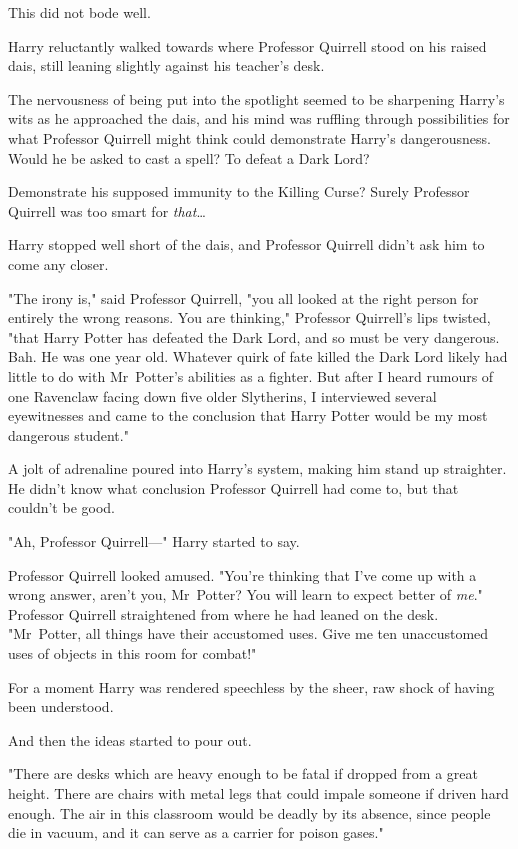 This did not bode well.

Harry reluctantly walked towards where Professor Quirrell stood on his raised
dais, still leaning slightly against his teacher’s desk.

The nervousness of being put into the spotlight seemed to be sharpening Harry’s
wits as he approached the dais, and his mind was ruffling through possibilities
for what Professor Quirrell might think could demonstrate Harry’s
dangerousness. Would he be asked to cast a spell? To defeat a Dark Lord?

Demonstrate his supposed immunity to the Killing Curse? Surely Professor
Quirrell was too smart for \emph{that}…

Harry stopped well short of the dais, and Professor Quirrell didn’t ask him to
come any closer.

"The irony is," said Professor Quirrell, "you all looked at the right person
for entirely the wrong reasons. You are thinking," Professor Quirrell’s lips
twisted, "that Harry Potter has defeated the Dark Lord, and so must be very
dangerous. Bah. He was one year old. Whatever quirk of fate killed the Dark
Lord likely had little to do with Mr~Potter’s abilities as a fighter. But
after I heard rumours of one Ravenclaw facing down five older Slytherins, I
interviewed several eyewitnesses and came to the conclusion that Harry Potter
would be my most dangerous student."

A jolt of adrenaline poured into Harry’s system, making him stand up
straighter. He didn’t know what conclusion Professor Quirrell had come to, but
that couldn’t be good.

"Ah, Professor Quirrell—" Harry started to say.

Professor Quirrell looked amused. "You’re thinking that I’ve come up with a
wrong answer, aren’t you, Mr~Potter? You will learn to expect better of
\emph{me}." Professor Quirrell straightened from where he had leaned on the
desk. "Mr~Potter, all things have their accustomed uses. Give me ten
unaccustomed uses of objects in this room for combat!"

For a moment Harry was rendered speechless by the sheer, raw shock of having
been understood.

And then the ideas started to pour out.

"There are desks which are heavy enough to be fatal if dropped from a great
height. There are chairs with metal legs that could impale someone if driven
hard enough. The air in this classroom would be deadly by its absence, since
people die in vacuum, and it can serve as a carrier for poison gases."

